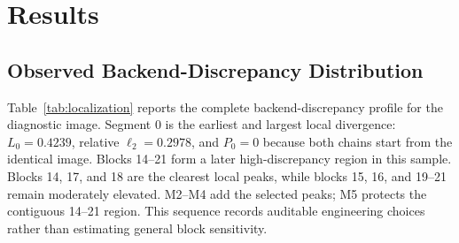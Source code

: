 \documentclass[conference]{IEEEtran}
\begin{document}
\section{Results}
\label{sec:results}

\subsection{Observed Backend-Discrepancy Distribution}

Table~\ref{tab:localization} reports the complete backend-discrepancy profile for the diagnostic image. Segment 0 is the earliest and largest local divergence: $L_0=0.4239$, relative $\ell_2=0.2978$, and $P_0=0$ because both chains start from the identical image. Blocks 14--21 form a later high-discrepancy region in this sample. Blocks 14, 17, and 18 are the clearest local peaks, while blocks 15, 16, and 19--21 remain moderately elevated. M2--M4 add the selected peaks; M5 protects the contiguous 14--21 region. This sequence records auditable engineering choices rather than estimating general block sensitivity.
\end{document}
